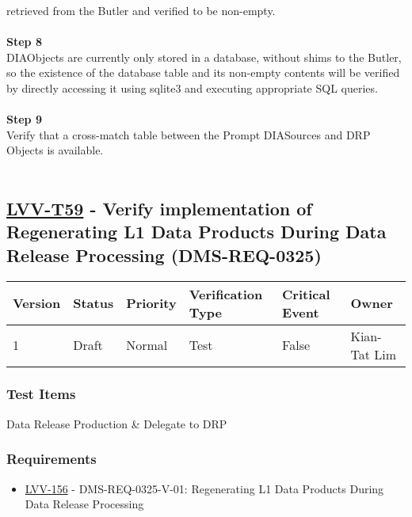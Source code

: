 retrieved from the Butler and verified to be non-empty.\\
~\\
\textbf{Step 8}\\
DIAObjects are currently only stored in a database, without shims to the
Butler, so the existence of the database table and its non-empty
contents will be verified by directly accessing it using sqlite3 and
executing appropriate SQL queries.\\
~\\
\textbf{Step 9}\\
Verify that a cross-match table between the Prompt DIASources and DRP
Objects is available.\\
~\\

\hypertarget{lvv-t59---verify-implementation-of-regenerating-l1-data-products-during-data-release-processing-dms-req-0325}{%
\subsection{\texorpdfstring{\href{https://jira.lsstcorp.org/secure/Tests.jspa\#/testCase/LVV-T59}{LVV-T59}
- Verify implementation of Regenerating L1 Data Products During Data
Release Processing
(DMS-REQ-0325)}{LVV-T59 - Verify implementation of Regenerating L1 Data Products During Data Release Processing (DMS-REQ-0325)}}\label{lvv-t59---verify-implementation-of-regenerating-l1-data-products-during-data-release-processing-dms-req-0325}}

\begin{longtable}[]{@{}llllll@{}}
\toprule
Version & Status & Priority & Verification Type & Critical Event &
Owner\tabularnewline
\midrule
\endhead
1 & Draft & Normal & Test & False & Kian-Tat Lim\tabularnewline
\bottomrule
\end{longtable}

\hypertarget{test-items-35}{%
\subsubsection{Test Items}\label{test-items-35}}

Data Release Production \& Delegate to DRP

\hypertarget{requirements-36}{%
\subsubsection{Requirements}\label{requirements-36}}

\begin{itemize}
\tightlist
\item
  \href{https://jira.lsstcorp.org/browse/LVV-156}{LVV-156} -
  DMS-REQ-0325-V-01: Regenerating L1 Data Products During Data Release
  Processing
\end{itemize}

